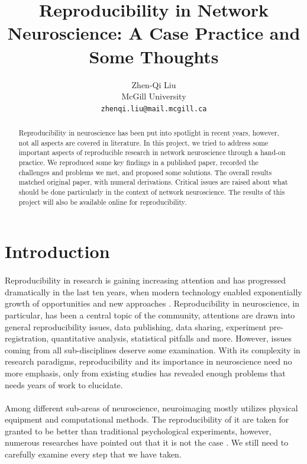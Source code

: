 \documentclass{article}
\title{Reproducibility in Network Neuroscience: A Case Practice and Some Thoughts}
\author{
  Zhen-Qi Liu\\
  McGill University\\
  \texttt{zhenqi.liu@mail.mcgill.ca}
}
\begin{document}

\maketitle
\begin{abstract}
Reproducibility in neuroscience has been put into spotlight in recent years, however, not all aspects are covered in literature. In this project, we tried to address some important aspects of reproducible research in network neuroscience through a hand-on practice. We reproduced some key findings in a published paper, recorded the challenges and problems we met, and proposed some solutions. The overall results matched original paper, with numeral derivations. Critical issues are raised about what should be done particularly in the context of network neuroscience. The results of this project will also be available online for reproducibility.

\end{abstract}

\section*{Introduction}
\paragraph{}
Reproducibility in research is gaining increasing attention and has progressed dramatically in the last ten years, when modern technology enabled exponentially growth of opportunities and new approaches \cite{baggerly_deriving_2009}.
Reproducibility in neuroscience, in particular, has been a central topic of the community, attentions are drawn into general reproducibility issues, data publishing, data sharing, experiment pre-registration, quantitative analysis, statistical pitfalls and more. However, issues coming from all sub-disciplines deserve some examination. With its complexity in research paradigms, reproducibility and its importance in neuroscience need no more emphasis, only from existing studies has revealed enough problems that needs years of work to elucidate.
\paragraph{}
Among different sub-areas of neuroscience, neuroimaging mostly utilizes physical equipment and computational methods. The reproducibility of it are taken for granted to be better than traditional psychological experiments, however, numerous researches have pointed out that it is not the case \cite{carp_plurality_2012, bowring_exploring_2018}. We still need to carefully examine every step that we have taken.
\end{document}
